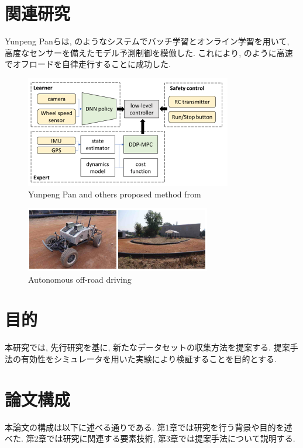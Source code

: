 \section{関連研究}
Yunpeng Pan\cite{batch}らは, のようなシステムでバッチ学習とオンライン学習を用いて, 高度なセンサーを備えたモデル予測制御を模倣した. これにより, のように高速でオフロードを自律走行することに成功した. 

\begin{figure}[h]
     \centering
     \includegraphics[keepaspectratio, scale=0.6]{images/batch1.png}
     \caption{Yunpeng Pan and others proposed method from \cite{batch}}
     \label{Fig:batch1}
     \end{figure}

\begin{figure}[h]
     \centering
     \includegraphics[keepaspectratio, scale=0.6]{images/batch2.png}
     \caption{Autonomous off-road driving}
     \label{Fig:batch2}
     \end{figure}

\newpage
\section{目的}
本研究では, 先行研究を基に, 新たなデータセットの収集方法を提案する. 提案手法の有効性をシミュレータを用いた実験により検証することを目的とする. 

\section{論文構成}
本論文の構成は以下に述べる通りである. 第1章では研究を行う背景や目的を述べた. 第2章では研究に関連する要素技術, 第3章では提案手法について説明する. 
     
